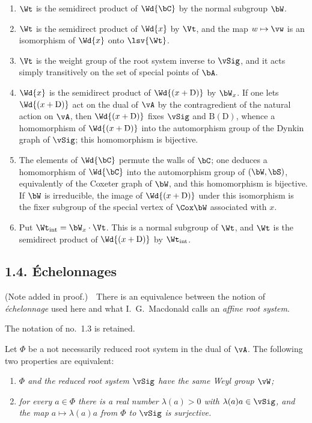 \documentclass[12pt,a4paper,oneside,english]{smfart}
\makeatletter
\newcommand{\btanchor}[1]{\leavevmode\Hy@raisedlink{\hypertarget{bt:#1}{}}}
\newcommand{\btsecB}[2]{%
  \par\needspace{4\baselineskip}\phantomsection
  \subsection*{#2}%
  \ifx\relax#1\relax\else\btanchor{#1}\fi}
\theoremstyle{definition}
\theoremstyle{bt}
\makeatother
\begin{document}
\begin{enumerate}[label=(\arabic*),leftmargin=2.4em,itemsep=.35em]
\item $\Wt$ is the semidirect product of $\Wd{\bC}$ by the normal subgroup
      $\bW$.

\item $\Wt$ is the semidirect product of $\Wd{x}$ by $\Vt$, and the map
      $w\mapsto \vw$ is an isomorphism of $\Wd{x}$ onto $\lsv{\Wt}$.

\item $\Vt$ is the weight group of the root system inverse to $\vSig$, and it
      acts simply transitively on the set of special points of $\bA$.

\item $\Wd{x}$ is the semidirect product of $\Wd{(x+\mathrm{D})}$ by $\bW_x$.
      If one lets $\Wd{(x+\mathrm{D})}$ act on the dual of $\vA$ by the       contragredient of the natural action on $\vA$, then       $\Wd{(x+\mathrm{D})}$ fixes $\vSig$ and $\mathrm{B}(\mathrm{D})$, whence       a homomorphism of $\Wd{(x+\mathrm{D})}$ into the automorphism group of       the Dynkin graph of $\vSig$; this homomorphism is bijective.

\item The elements of $\Wd{\bC}$ permute the walls of $\bC$; one deduces a
      homomorphism of $\Wd{\bC}$ into the automorphism group of $(\bW,\bS)$,       equivalently of the Coxeter graph of $\bW$, and this homomorphism is       bijective.  If $\bW$ is irreducible, the image of       $\Wd{(x+\mathrm{D})}$ under this isomorphism is the fixer subgroup of       the special vertex of $\Cox\bW$ associated with $x$.

\item Put $\Wt_{\mathrm{int}}=\bW_x\cdot\Vt$.  This is a normal subgroup of
      $\Wt$, and $\Wt$ is the semidirect product of $\Wd{(x+\mathrm{D})}$ by       $\Wt_{\mathrm{int}}$.
\end{enumerate}
\bigskip

\btsecB{1.4}{1.4. \'Echelonnages}

\noindent\footnotesize
(Note added in proof.)\ \ There is an equivalence between the notion of
\emph{\'echelonnage} used here and what I.~G.~Macdonald calls an
\emph{affine root system}.
\normalsize

\medskip
The notation of no.~1.3 is retained.

\btanchor{1.4.1}
Let $\Phi$ be a not necessarily reduced root system in the dual of $\vA$. The following two properties are equivalent:
\begin{enumerate}[label=(\roman*),leftmargin=2.4em,itemsep=.3em]
\item \textit{$\Phi$ and the reduced root system $\vSig$ have the same Weyl
      group $\vW$;}
\item \textit{for every $a\in\Phi$ there is a real number $\lambda(a)>0$ with
      $\lambda(a)a\in\vSig$, and the map $a\mapsto\lambda(a)a$ from $\Phi$ to       $\vSig$ is surjective.}
\end{enumerate}
\end{document}
